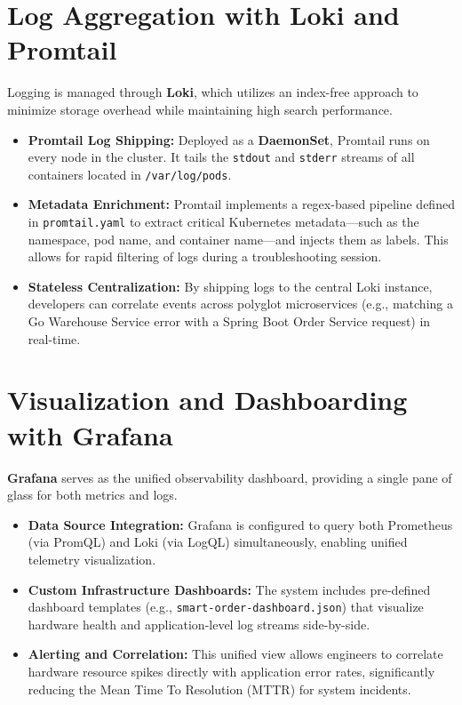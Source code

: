 \documentclass[12pt,a4paper]{report}
\begin{document}
\section{Log Aggregation with Loki and Promtail}
Logging is managed through \textbf{Loki}, which utilizes an index-free approach to minimize storage overhead while maintaining high search performance.
\begin{itemize}
    \item \textbf{Promtail Log Shipping:} Deployed as a \textbf{DaemonSet}, Promtail runs on every node in the cluster. It tails the \texttt{stdout} and \texttt{stderr} streams of all containers located in \texttt{/var/log/pods}.
    \item \textbf{Metadata Enrichment:} Promtail implements a regex-based pipeline defined in \texttt{promtail.yaml} to extract critical Kubernetes metadata—such as the namespace, pod name, and container name—and injects them as labels. This allows for rapid filtering of logs during a troubleshooting session.
    \item \textbf{Stateless Centralization:} By shipping logs to the central Loki instance, developers can correlate events across polyglot microservices (e.g., matching a Go Warehouse Service error with a Spring Boot Order Service request) in real-time.
\end{itemize}

\section{Visualization and Dashboarding with Grafana}
\textbf{Grafana} serves as the unified observability dashboard, providing a single pane of glass for both metrics and logs.
\begin{itemize}
    \item \textbf{Data Source Integration:} Grafana is configured to query both Prometheus (via PromQL) and Loki (via LogQL) simultaneously, enabling unified telemetry visualization.
    \item \textbf{Custom Infrastructure Dashboards:} The system includes pre-defined dashboard templates (e.g., \texttt{smart-order-dashboard.json}) that visualize hardware health and application-level log streams side-by-side. 
    \item \textbf{Alerting and Correlation:} This unified view allows engineers to correlate hardware resource spikes directly with application error rates, significantly reducing the Mean Time To Resolution (MTTR) for system incidents.
\end{itemize}
\end{document}
